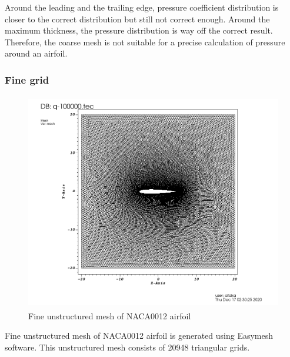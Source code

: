 \documentclass[letterpaper,12pt]{article}
\begin{document}
\vspace{1cm}

Around the leading and the trailing edge, pressure coefficient distribution is
closer to the correct distribution but still not correct enough. Around the maximum
thickness, the pressure distribution is way off the correct result. Therefore, the coarse
mesh is not suitable for a precise calculation of pressure around an airfoil.

\newpage

\subsubsection{Fine grid}

\begin{figure} [!h]
	\centering
	\includegraphics[height = 9.5cm]{graph/fine/fine_209480000.png}
	\caption{Fine unstructured mesh of NACA0012 airfoil}
    \label{fig:airfoilmeshfine}
\end{figure}

\vspace{1cm}

Fine unstructured mesh of NACA0012 airfoil is generated using Easymesh software. This 
unstructured mesh consists of 20948 triangular grids.

\newpage
\end{document}
